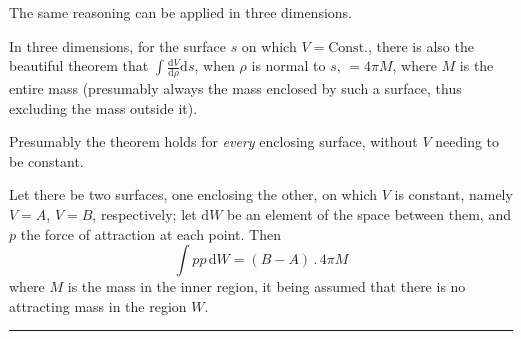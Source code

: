 The same reasoning can be applied in three dimensions.


In three dimensions, for the surface $s$ on which $V=\mathrm{Const.}$, there is also the
beautiful theorem that $\int\frac{\mathrm{d}V}{\mathrm{d}\rho}\mathrm{d}s$,
when $\rho$ is normal to $s$, $=4\pi M$, where $M$ is
the entire mass (presumably always the mass enclosed by such a surface,
thus excluding the mass outside it).

Presumably the theorem holds for \emph{every} enclosing surface, without $V$
needing to be constant.


Let there be two surfaces, one enclosing the other, on which $V$ is constant,
namely $V=A$, $V=B$, respectively; let $\mathrm{d}W$ be an element of the space between them,
and $p$ the force of attraction at each point. Then
\[
\int pp\,\mathrm{d}W=(B-A)\, .\,4\pi M
\]
where $M$ is the mass in the inner region, it being assumed that there is no attracting mass
in the region $W$.

\par\nopagebreak\begin{center}\rule{93.96bp}{0.35pt}\end{center}

\clearpage
\endgroup
